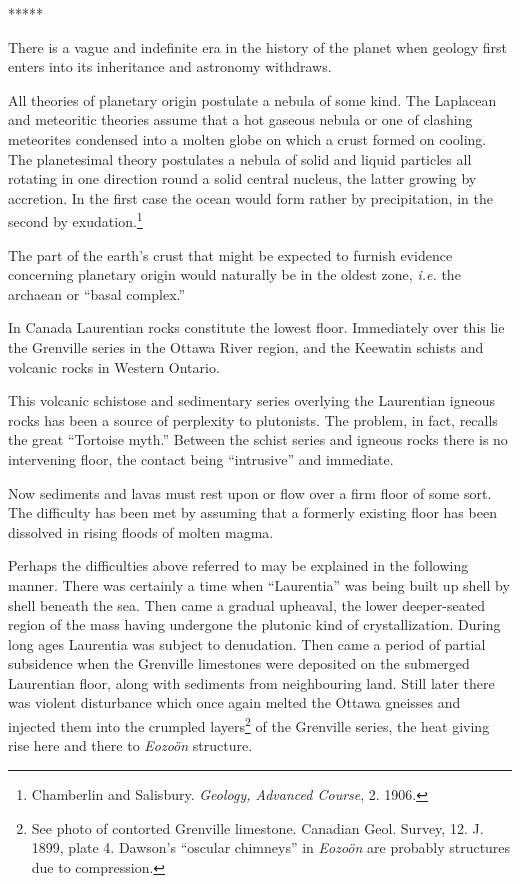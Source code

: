\documentclass[a4paper, 12pt, oneside, landscape]{article}
\begin{document}
\centerline{*\hspace{15mm}*\hspace{15mm}*\hspace{15mm}*\hspace{15mm}*}
\bigskip

There is a vague and indefinite era in the history of the planet when geology first enters into its inheritance and astronomy withdraws.

All theories of planetary origin postulate a nebula of some kind. The Laplacean and meteoritic theories assume that a hot gaseous nebula or one of clashing meteorites condensed into a molten globe on which a crust formed on cooling. The planetesimal theory postulates a nebula of solid and liquid particles all rotating in one direction round a solid central nucleus, the latter growing by accretion. In the first case the ocean would form rather by precipitation, in the second by exudation.\footnote{Chamberlin and Salisbury. \emph{Geology, Advanced Course}, 2. 1906.}

The part of the earth's crust that might be expected to furnish evidence concerning planetary origin would naturally be in the oldest zone, \emph{i.e.} the archaean or ``basal complex.''

In Canada Laurentian rocks constitute the lowest floor. Immediately over this lie the Grenville series in the Ottawa River region, and the Keewatin schists and volcanic rocks in Western Ontario.

This volcanic schistose and sedimentary series overlying the Laurentian igneous rocks has been a source of perplexity to plutonists. The problem, in fact, recalls the great ``Tortoise myth.'' Between the schist series and igneous rocks there is no intervening floor, the contact being ``intrusive'' and immediate.

Now sediments and lavas must rest upon or flow over a firm floor of some sort. The difficulty has been met by assuming that a formerly existing floor has been dissolved in rising floods of molten magma.

Perhaps the difficulties above referred to may be explained in the following manner. There was certainly a time when ``Laurentia'' was being built up shell by shell beneath the sea. Then came a gradual upheaval, the lower deeper-seated region of the mass having undergone the plutonic kind of crystallization. During long ages Laurentia was subject to denudation. Then came a period of partial subsidence when the Grenville limestones were deposited on the submerged Laurentian floor, along with sediments from neighbouring land. Still later there was violent disturbance which once again melted the Ottawa gneisses and injected them into the crumpled layers\footnote{See photo of contorted Grenville limestone. Canadian Geol. Survey, 12. J. 1899, plate 4. Dawson's ``oscular chimneys'' in \emph{Eozoön} are probably structures due to compression.} of the Grenville series, the heat giving rise here and there to \emph{Eozoön} structure.
\end{document}
